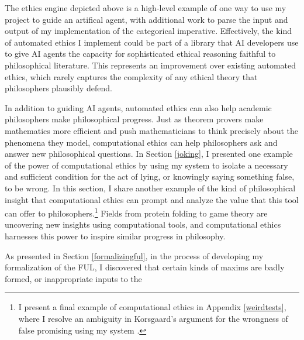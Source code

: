 \begin{isabellebody}
\begin{isamarkuptext}
The ethics engine depicted above is a high-level example of one way to use my project to guide an artifical agent,
with additional work to parse the input and output of my implementation of the categorical imperative.
Effectively, the kind of automated ethics I implement could be part of a library that AI developers use to 
give AI agents the capacity for sophisticated ethical reasoning faithful to philosophical literature. 
This represents an improvement over existing automated ethics, which rarely captures the complexity 
of any ethical theory that philosophers plausibly defend.%
\end{isamarkuptext}\isamarkuptrue%
%
\isadelimdocument
%
\endisadelimdocument
%
\isatagdocument
%
\isamarkuptrue%
%
\endisatagdocument
{\isafolddocument}%
%
\isadelimdocument
%
\endisadelimdocument
%
\begin{isamarkuptext}%
In addition to guiding AI agents, automated ethics can also help academic philosophers make philosophical
progress. Just as theorem provers make mathematics more efficient and push mathematicians to think 
precisely about the phenomena they model, computational ethics can help philosophers ask and answer
new philosophical questions. In Section \ref{joking}, I presented one example of the power of computational ethics
by using my system to isolate a necessary and sufficient condition for the act of lying, or knowingly saying
something false, to be wrong. In this section, I share another example of the kind of philosophical 
insight that computational ethics can prompt and analyze the value that this tool can offer to philosophers.\footnote{
I present a final example of computational ethics in Appendix \ref{weirdtests}, where I resolve an ambiguity 
in Korsgaard's argument for the wrongness of false promising using my system \citep{KorsgaardFUL}.} 
Fields from protein folding to game theory are uncovering new insights using computational tools, and computational
ethics harnesses this power to inspire similar progress in philosophy.%
\end{isamarkuptext}\isamarkuptrue%
%
\isadelimdocument
%
\endisadelimdocument
%
\isatagdocument
%
\isamarkuptrue%
%
\endisatagdocument
{\isafolddocument}%
%
\isadelimdocument
%
\endisadelimdocument
%
\begin{isamarkuptext}%
As presented in Section \ref{formalizingful}, in the process of developing my formalization of
the FUL, I discovered that certain kinds of maxims are badly formed, or inappropriate inputs to the 

\end{isamarkuptext}
\end{isabellebody}
